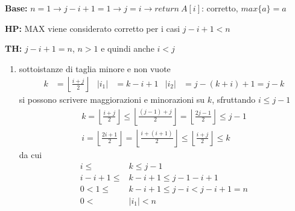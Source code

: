 \begin{description}
    \item{\textbf{Base:}} $n=1 \rightarrow j-i+1=1 \rightarrow j=i \rightarrow return \: A[i]$: corretto, $max\{a\}=a$
    \item{\textbf{HP:}} MAX viene considerato corretto per i casi $j-i+1 < n$
    \item{\textbf{TH:}} $j-i+1 = n$, $n>1$ e quindi anche $i<j$
        \begin{enumerate}[noitemsep,topsep=0pt,parsep=0pt,partopsep=0pt]
            \item sottoistanze di taglia minore e non vuote
                \begin{align*}
                    k&= \left\lfloor \frac{i+j}{2}\right\rfloor & |i_1| &= k-i+1  & |i_2| &= j-(k+i)+1 = j-k
                \end{align*}
                si possono scrivere maggiorazioni e minorazioni su $k$, sfruttando $i \leq j-1$
                \begin{gather*}
                    k= \left\lfloor \frac{i+j}{2}\right\rfloor \leq
                    \left\lfloor \frac{(j-1)+j}{2}\right\rfloor = 
                    \left\lfloor \frac{2j-1}{2}\right\rfloor \leq j-1 \\
                    i= \left\lfloor \frac{2i+1}{2}\right\rfloor
                    = \left\lfloor \frac{i+(i+1)}{2}\right\rfloor 
                    \leq \left\lfloor \frac{i+j}{2}\right\rfloor 
                    \leq k
                \end{gather*}
                da cui 
                \begin{equation*}
                    \begin{split}
                    i \leq &k \leq j-1 \\
                    i-i+1 \leq &k-i+1 \leq j-1-i+1 \\
                    0 < 1 \leq &k-i+1 \leq j-i < j-i+1 = n\\
                    0 < &|i_1| < n
                    \end{split}

\end{equation*}
\end{enumerate}
\end{description}
